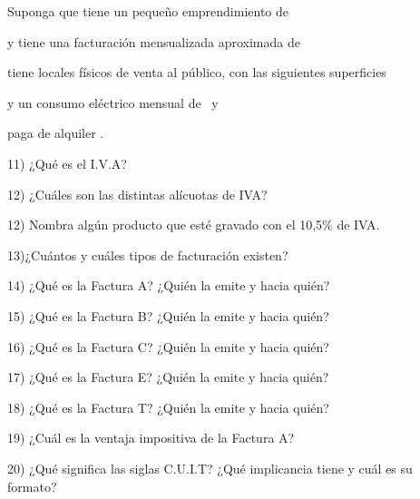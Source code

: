 \vspace{47pt}
\leftskip=36pt
Suponga que tiene un pequeño emprendimiento de \dotfill\par
\vspace{16pt}
y tiene una facturación mensualizada aproximada de \dotfill\par
\vspace{16pt}
tiene \exPuntos{2.9cm} locales físicos de venta al público, con las siguientes superficies\par
\vspace{30pt}
\exPuntos{4.2cm} y un consumo eléctrico mensual de \dotfill\ y\par
\vspace{16pt}
paga de alquiler \exPuntos{6.4cm} .\par
\leftskip=0pt

\vspace{57pt}
\vspace{13pt}

\newpage
\thispagestyle{empty}
\vspace*{50pt}
11) ¿Qué es el I.V.A?\par
\vspace{16pt}
12) ¿Cuáles son las distintas alícuotas de IVA?\par
\vspace{30pt}
12) Nombra algún producto que esté gravado con el 10,5\% de IVA.\par
\vspace{30pt}
13)¿Cuántos y cuáles tipos de facturación existen?\par
\vspace{30pt}
14) ¿Qué es la Factura A? ¿Quién la emite y hacia quién?\par
\vspace{30pt}
15) ¿Qué es la Factura B? ¿Quién la emite y hacia quién?\par
\vspace{30pt}
16) ¿Qué es la Factura C? ¿Quién la emite y hacia quién?\par
\vspace{30pt}
17) ¿Qué es la Factura E? ¿Quién la emite y hacia quién?\par
\vspace{30pt}
18) ¿Qué es la Factura T? ¿Quién la emite y hacia quién?\par
\vspace{30pt}
19) ¿Cuál es la ventaja impositiva de la Factura A?\par
\vspace{26pt}
20) ¿Qué significa las siglas C.U.I.T? ¿Qué implicancia tiene y cuál es su formato?\par

\endgroup
\clearpage
\restoregeometry
